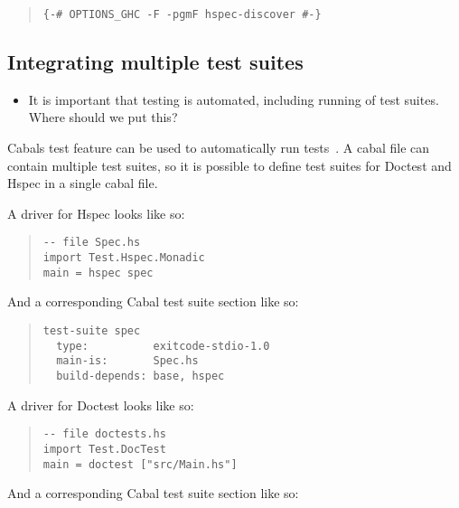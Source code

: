 \documentclass[preprint]{sigplanconf}
\begin{document}
\begin{quote}
\small
\begin{verbatim}
{-# OPTIONS_GHC -F -pgmF hspec-discover #-}
\end{verbatim}
\end{quote}

\subsection{Integrating multiple test suites}

\begin{itemize}

\item It is important that testing is automated, including running of test
    suites.  Where should we put this?
\end{itemize}

\noindent Cabals test feature can be used to automatically run tests~\cite{cabal}.  A cabal
file can contain multiple test suites, so it is possible to define test suites
for Doctest and Hspec in a single cabal file.

A driver for Hspec looks like so:

\begin{quote}
\small
\begin{verbatim}
-- file Spec.hs
import Test.Hspec.Monadic
main = hspec spec
\end{verbatim}
\end{quote}

\noindent And a corresponding Cabal test suite section like so:

\begin{quote}
\small
\begin{verbatim}
test-suite spec
  type:          exitcode-stdio-1.0
  main-is:       Spec.hs
  build-depends: base, hspec
\end{verbatim}
\end{quote}

\noindent A driver for Doctest looks like so:

\begin{quote}
\small
\begin{verbatim}
-- file doctests.hs
import Test.DocTest
main = doctest ["src/Main.hs"]
\end{verbatim}
\end{quote}

\noindent And a corresponding Cabal test suite section like so:
\end{document}
